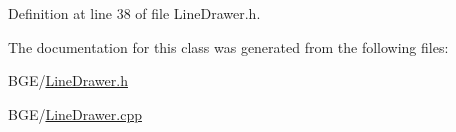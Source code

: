 Definition at line 38 of file Line\-Drawer.\-h.



The documentation for this class was generated from the following files\-:\begin{DoxyCompactItemize}
\item 
B\-G\-E/\hyperlink{_line_drawer_8h}{Line\-Drawer.\-h}\item 
B\-G\-E/\hyperlink{_line_drawer_8cpp}{Line\-Drawer.\-cpp}\end{DoxyCompactItemize}
